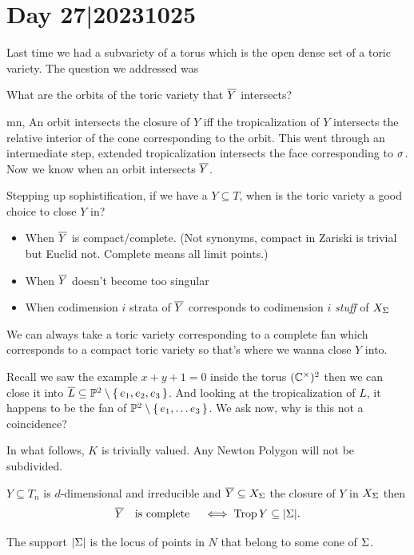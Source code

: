 \documentclass[12pt]{memoir}
\DeclareMathOperator{\Trop}{Trop}
\theoremstyle{definition}
\begin{document}
\section{Day 27|20231025}

Last time we had a subvariety of a torus which is the open dense set of a toric variety. The question we addressed was 
\begin{significant}
    What are the orbits of the toric variety that $\overline Y$ intersects?
\end{significant}mn,
An orbit intersects the closure of $Y$ iff the tropicalization of $Y$ intersects the relative interior of the cone corresponding to the orbit. This went through an intermediate step, extended tropicalization intersects the face corresponding to $\sigma$. Now we know when an orbit intersects $\overline Y$.\par 
Stepping up sophistification, if we have a $Y\subseteq T$, when is the toric variety a good choice to close $Y$ in? 
\begin{itemize}
    \item When $\overline Y$ is compact/complete. (Not synonyms, compact in Zariski is trivial but Euclid not. Complete means all limit points.)
    \item When $\overline Y$ doesn't become too singular
    \item When codimension $i$ strata of $\overline Y$ corresponds to codimension $i$ \emph{stuff} of $X_\Sigma$ 
\end{itemize}
We can always take a toric variety corresponding to a complete fan which corresponds to a compact toric variety so that's where we wanna close $Y$ into.\par
Recall we saw the example $x+y+1=0$ inside the torus $(\mathbb{C}^\times)^2$ then we can close it into $\overline L\subseteq \mathbb{P}^2\setminus\{\,e_1,e_2,e_3\,\}$. And looking at the tropicalization of $L$, it happens to be the fan of $\mathbb{P}^2\setminus\{\,e_1,\dots e_3\,\}$. We ask now, why is this not a coincidence?\par 
In what follows, $K$ is trivially valued. Any Newton Polygon will not be subdivided.

\begin{Th}
$Y\subseteq T_n$ is $d$-dimensional and irreducible and $\overline Y\subseteq X_\Sigma$ the closure of $Y$ in $X_\Sigma$ then 
$$\ov Y\word{is complete}\iff \Trop Y\subseteq |\Sg|.$$
\end{Th}

The support $|\Sigma|$ is the locus of points in $N$ that belong to some cone of $\Sigma$.
\end{document}
